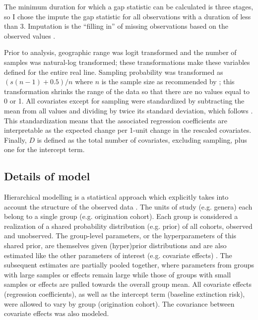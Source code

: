 \documentclass[11pt]{article}
\begin{document}
The minimum duration for which a gap statistic can be calculated is three stages, so I chose the impute the gap statistic for all observations with a duration of less than 3. Imputation is the ``filling in'' of missing observations based on the observed values \citep{Rubin1996,Gelman2007}.

Prior to analysis, geographic range was logit transformed and the number of samples was natural-log transformed; these transformations make these variables defined for the entire real line. Sampling probability was transformed as \((s (n - 1) + 0.5) / n\) where \(n\) is the sample size as recommended by \citet{Smithson2006}; this transformation shrinks the range of the data so that there are no values equal to 0 or 1. All covariates except for sampling were standardized by subtracting the mean from all values and dividing by twice its standard deviation, which follows \citet{Gelman2007}. This standardization means that the associated regression coefficients are interpretable as the expected change per 1-unit change in the rescaled covariates. Finally, \(D\) is defined as the total number of covariates, excluding sampling, plus one for the intercept term.



\subsection*{Details of model}

Hierarchical modelling is a statistical approach which explicitly takes into account the structure of the observed data \citep{Gelman2013d,Gelman2007}. The units of study (e.g. genera) each belong to a single group (e.g. origination cohort). Each group is considered a realization of a shared probability distribution (e.g. prior) of all cohorts, observed and unobserved. The group-level parameters, or the hyperparameters of this shared prior, are themselves given (hyper)prior distributions and are also estimated like the other parameters of interest (e.g. covariate effects) \citep{Gelman2013d}. The subsequent estimates are partially pooled together, where parameters from groups with large samples or effects remain large while those of groups with small samples or effects are pulled towards the overall group mean. All covariate effects (regression coefficients), as well as the intercept term (baseline extinction risk), were allowed to vary by group (origination cohort). The covariance between covariate effects was also modeled. 
\end{document}
